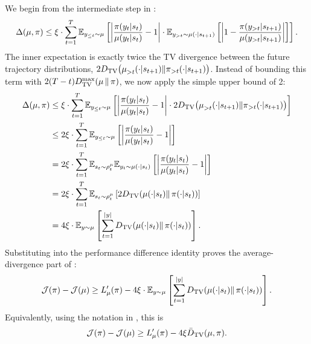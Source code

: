 We begin from the intermediate step in :  
\begin{equation*}  
\Delta(\rolloutpi, \trainerpi) \le \xi \cdot \sum_{t=1}^{T} \mathbb{E}_{y_{\le t} \sim \rolloutpi} \left[ \left| \frac{\trainerpi(y_t|s_t)}{\rolloutpi(y_t|s_t)} - 1 \right| \cdot \mathbb{E}_{y_{>t} \sim \rolloutpi(\cdot|s_{t+1})} \left[ \left| 1 - \frac{\trainerpi(y_{>t}|s_{t+1})}{\rolloutpi(y_{>t}|s_{t+1})} \right| \right] \right].  
\end{equation*}  
The inner expectation is exactly twice the TV divergence between the future trajectory distributions, $2 D_{\mathrm{TV}}\big({\rolloutpi}_{>t}(\cdot|s_{t+1}) \|  {\trainerpi}_{>t}(\cdot|s_{t+1})\big)$. Instead of bounding this term with $2 (T-t) D_{\mathrm{TV}}^{\max}(\rolloutpi \|  \trainerpi)$, we now apply the simple upper bound of 2:  
\begin{align}  
\Delta(\rolloutpi, \trainerpi) &\le \xi \cdot \sum_{t=1}^{T} \mathbb{E}_{y_{\le t} \sim \rolloutpi} \left[ \left| \frac{\trainerpi(y_t|s_t)}{\rolloutpi(y_t|s_t)} - 1 \right| \cdot 2 D_{\mathrm{TV}}\big({\rolloutpi}_{>t}(\cdot|s_{t+1}) \|  {\trainerpi}_{>t}(\cdot|s_{t+1})\big) \right] \nonumber \\  
&\le 2\xi \cdot \sum_{t=1}^{T} \mathbb{E}_{y_{\le t} \sim \rolloutpi} \left[ \left| \frac{\trainerpi(y_t|s_t)}{\rolloutpi(y_t|s_t)} - 1 \right| \right] \label{eq:tighter_bound_step1} \\  
&= 2\xi \cdot \sum_{t=1}^{T} \mathbb{E}_{s_t \sim \rho_t^{\rolloutpi}} \mathbb{E}_{y_t \sim \rolloutpi(\cdot|s_t)} \left[ \left| \frac{\trainerpi(y_t|s_t)}{\rolloutpi(y_t|s_t)} - 1 \right| \right] \nonumber \\  
&= 2\xi \cdot \sum_{t=1}^{T} \mathbb{E}_{s_t \sim \rho_t^{\rolloutpi}} \left[ 2 D_{\mathrm{TV}}(\rolloutpi(\cdot|s_t) \|  \trainerpi(\cdot|s_t)) \right] \nonumber \\  
&= 4\xi \cdot \mathbb{E}_{y \sim \rolloutpi} \left[ \sum_{t=1}^{|y|} D_{\mathrm{TV}}(\rolloutpi(\cdot|s_t) \|  \trainerpi(\cdot|s_t)) \right]. \label{eq:tighter_bound_final}  
\end{align}  
Substituting  into the performance difference identity proves the average-divergence part of :
\begin{equation*}
\mathcal{J}(\trainerpi) - \mathcal{J}(\rolloutpi)
\ge L_{\rolloutpi}'(\trainerpi) - 4\xi \cdot \mathbb{E}_{y \sim \rolloutpi} \left[ \sum_{t=1}^{|y|} D_{\mathrm{TV}}(\rolloutpi(\cdot|s_t) \|  \trainerpi(\cdot|s_t)) \right].
\end{equation*}
Equivalently, using the notation in , this is
\begin{equation*}
\mathcal{J}(\trainerpi) - \mathcal{J}(\rolloutpi)
\ge L_{\rolloutpi}'(\trainerpi) - 4\xi \bar{D}_{\mathrm{TV}}(\rolloutpi,\trainerpi).
\end{equation*}

